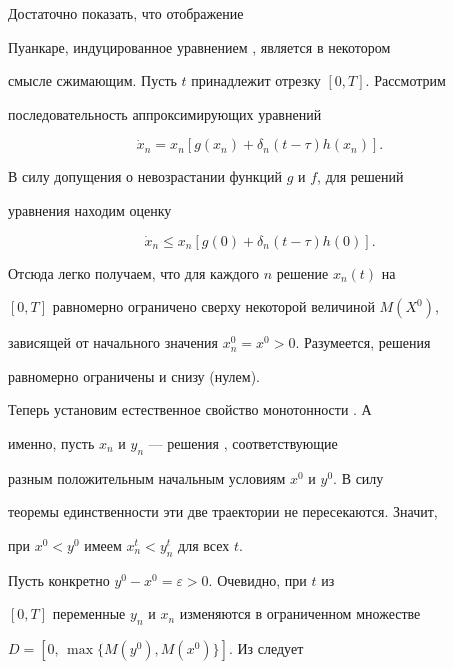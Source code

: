 \begin{pf} Достаточно показать, что отображение 


Пуанкаре, индуцированное уравнением , является в некотором 


смысле сжимающим. Пусть $t$ принадлежит отрезку $[0,T]$. Рассмотрим 


последовательность аппроксимирующих  уравнений


\begin{equation}


\Dot x_n=x_n[g(x_n)+\delta_n(t-\tau)h(x_n)].


\label{1.6}


\end{equation}





В силу допущения о невозрастании функций $g$ и $f$, для решений


уравнения  находим оценку


$$


\Dot x_n\leqslant x_n[g(0)+\delta_n(t-\tau)h(0)].


$$


Отсюда легко получаем, что для каждого $n$ решение $x_n(t)$ на 


$[0,T]$ равномерно ограничено сверху некоторой величиной $M(X^0)$, 


зависящей от начального значения $x_n^0=x^0>0$. Разумеется, решения 


 равномерно ограничены и снизу (нулем).





Теперь установим естественное свойство монотонности . А 


именно, пусть $x_n$ и $y_n$ --- решения , соответствующие 


разным положительным начальным условиям $x^0$ и $y^0$. В силу 


теоремы единственности эти две траектории не пересекаются. Значит,


при $x^0<y^0$ имеем $x_n^t<y_n^t$ для всех $t$.





Пусть конкретно $y^0-x^0=\varepsilon>0$. Очевидно, при $t$ из 


$[0,T]$ переменные $y_n$ и $x_n$ изменяются в ограниченном множестве


$D=[0,\,\max\{M(y^0),M(x^0)\}]$. Из  следует



\end{pf}
